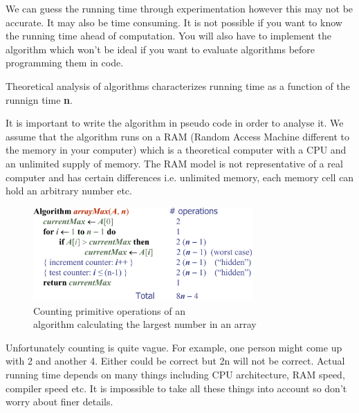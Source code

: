 \documentclass[12pt]{report}
\begin{document}
We can guess the running time through experimentation however this may not be accurate. It may also be time consuming. It is not possible if you want to know the running time ahead of computation. You will also have to implement the algorithm which won't be ideal if you want to evaluate algorithms before programming them in code.

Theoretical analysis of algorithms characterizes running time as a function of the runnign time \textbf{n}.

It is important to write the algorithm in pseudo code in order to analyse it. We assume that the algorithm runs on a RAM (Random Access Machine different to the memory in your computer) which is a theoretical computer with a CPU and an unlimited supply of memory. The RAM model is not representative of a real computer and has certain differences i.e. unlimited memory, each memory cell can hold an arbitrary number etc.

\begin{figure}[H]
    \centering
    \includegraphics[width=0.75\textwidth]{images/arraymaxalgo.png}
    \caption{Counting primitive operations of an\\ algorithm calculating the largest number in an array}
\end{figure}

Unfortunately counting is quite vague. For example, one person might come up with 2 and another 4. Either could be correct but 2n will not be correct. Actual running time depends on many things including CPU architecture, RAM speed, compiler speed etc. It is impossible to take all these things into account so don't worry about finer details.
\end{document}
